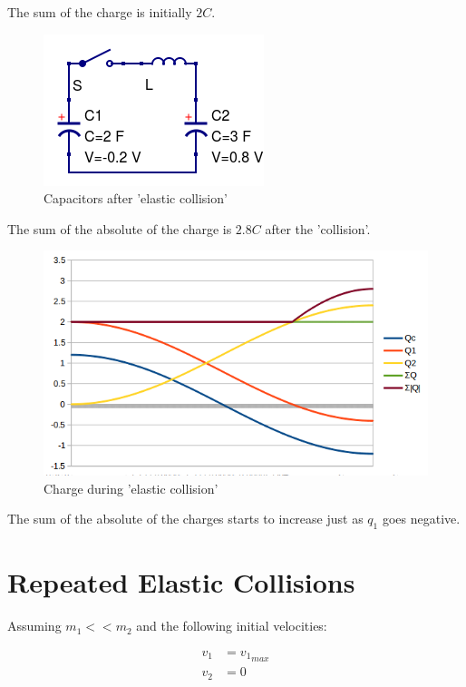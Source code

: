 \documentclass[]{elementary-physics}
\begin{document}
The sum of the charge is initially $2 C$.

\begin{figure}[ht] \centering
	\includegraphics[scale=.5]{ccl8} \caption{Capacitors after 'elastic collision'}
\end{figure}

The sum of the absolute of the charge is $2.8 C$ after the 'collision'.

\begin{figure}[ht] \centering
	\includegraphics[scale=.5]{cclg} \caption{Charge during 'elastic collision'}
\end{figure}

The sum of the absolute of the charges starts to increase just as $q_1$ goes negative.

\section{Repeated Elastic Collisions}

Assuming $m_1<<m_2$ and the following initial velocities:

\begin{subequations}
\begin{align}
v_1 &= {v_1}_{max} \\
v_2 &= 0
\end{align}
\end{subequations}
\end{document}
